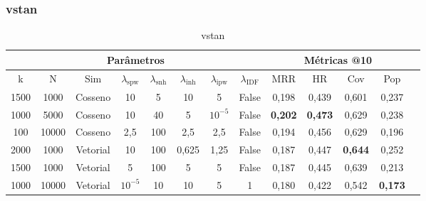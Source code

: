 \subsubsection{vstan}
\begin{table}[htbp]
    \centering
    \begin{tabular}{|c|c|c|c|c|c|c|c|c|c|c|c|c|}
      \hline
      \multicolumn{8}{|c|}{Parâmetros} & \multicolumn{4}{c|}{Métricas @10} \\
      \hline
      k & N & Sim & $\lambda_{\text{spw}}$ & $\lambda_{\text{snh}}$ & $\lambda_{\text{inh}}$ & $\lambda_{\text{ipw}}$ & $\lambda_{\text{IDF}}$ & MRR & HR & Cov & Pop \\
      \hline
      1500 & 1000 & Cosseno & 10 & 5 & 10 & 5 & False & 0,198 & 0,439 & 0,601 & 0,237 \\
      \hline
      1000 & 5000 & Cosseno & 10 & 40 & 5 & $10^{-5}$ & False & \textbf{0,202} & \textbf{0,473} & 0,629 & 0,238 \\
      \hline
      100 & 10000 & Cosseno & 2,5 & 100 & 2,5 & 2,5 & False & 0,194 & 0,456 & 0,629 & 0,196 \\
      \hline
      2000 & 1000 & Vetorial & 10 & 100 & 0,625 & 1,25 & False & 0,187 & 0,447 & \textbf{0,644} & 0,252 \\
      \hline
      1500 & 1000 & Vetorial & 5 & 100 & 5 & 5 & False & 0,187 & 0,445 & 0,639 & 0,213 \\
      \hline
      1000 & 10000 & Vetorial & $10^{-5}$ & 10 & 10 & 5 & 1 & 0,180 & 0,422 & 0,542 & \textbf{0,173} \\
      \hline
    \end{tabular}
    \caption{vstan}
  \end{table}


